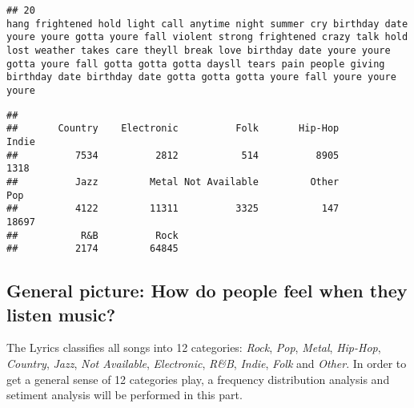 \documentclass[]{article}
\newenvironment{Shaded}{\begin{snugshade}}{\end{snugshade}}
\newcommand{\KeywordTok}[1]{\textcolor[rgb]{0.13,0.29,0.53}{\textbf{#1}}}
\newcommand{\NormalTok}[1]{#1}
\newcommand{\OperatorTok}[1]{\textcolor[rgb]{0.81,0.36,0.00}{\textbf{#1}}}
\begin{document}
\begin{verbatim}
## 20                                                                                                                                                                                                                                                                                                                                                                                                                                                                                                                                                                                                                                                                                                                                                                                                                                                                         hang frightened hold light call anytime night summer cry birthday date youre youre gotta youre fall violent strong frightened crazy talk hold lost weather takes care theyll break love birthday date youre youre gotta youre fall gotta gotta gotta daysll tears pain people giving birthday date birthday date gotta gotta gotta youre fall youre youre youre
\end{verbatim}

\begin{Shaded}
\end{Shaded}

\begin{verbatim}
## 
##       Country    Electronic          Folk       Hip-Hop         Indie 
##          7534          2812           514          8905          1318 
##          Jazz         Metal Not Available         Other           Pop 
##          4122         11311          3325           147         18697 
##           R&B          Rock 
##          2174         64845
\end{verbatim}

\hypertarget{general-picture-how-do-people-feel-when-they-listen-music}{%
\subsection{General picture: How do people feel when they listen
music?}\label{general-picture-how-do-people-feel-when-they-listen-music}}

The Lyrics classifies all songs into 12 categories: \emph{Rock},
\emph{Pop}, \emph{Metal}, \emph{Hip-Hop}, \emph{Country}, \emph{Jazz},
\emph{Not Available}, \emph{Electronic}, \emph{R\&B}, \emph{Indie},
\emph{Folk} and \emph{Other}. In order to get a general sense of 12
categories play, a frequency distribution analysis and setiment analysis
will be performed in this part.
\end{document}

